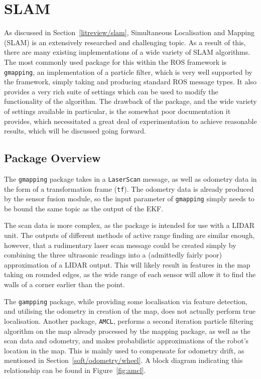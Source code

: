 \section{SLAM}\label{soft/SLAM}

As discussed in Section~\ref{litreview/slam}, Simultaneous Localisation and Mapping (SLAM) is an extensively
researched and challenging topic. As a result of this, there are many existing implementations of a wide
variety of SLAM algorithms. The most commonly used package for this within the ROS framework
is \verb|gmapping|, an implementation of a particle filter, which is very well supported by the framework,
simply taking and producing standard ROS message types. It also provides a very rich suite of settings which
can be used to modify the functionality of the algorithm. The drawback of the package, and the wide variety
of settings available in particular, is the somewhat poor documentation it provides, which necessitated a
great deal of experimentation to achieve reasonable results, which will be discussed going forward.

\subsection{Package Overview}\label{soft/SLAM/package}

The \verb|gmapping| package takes in a \verb|LaserScan| message, as well as odometry data in the form of a
transformation frame (\verb|tf|). The odometry data is already produced by the sensor fusion module, so the
input parameter of \verb|gmapping| simply needs to be bound the same topic as the output of the EKF.

The scan data is more complex, as the package is intended for use with a LIDAR unit. The outputs of different
methods of active range finding are similar enough, however, that a rudimentary laser scan message could be
created simply by combining the three ultrasonic readings into a (admittedly fairly poor) approximation of a
LIDAR output. This will likely result in features in the map taking on rounded edges, as the wide range of
each sensor will allow it to find the walls of a corner earlier than the point.

The \verb|gampping| package, while providing some localisation via feature detection, and utilising the odometry
in creation of the map, does not actually perform true localisation. Another package, \verb|AMCL|, performs a
second iteration particle filtering algorithm on the map already processed by the mapping package, as well as
the scan data and odometry, and makes probabilistic approximations of the robot's location in the map. This is
mainly used to compensate for odometry drift, as mentioned in Section~\ref{soft/odometry/wheel}. A block diagram
indicating this relationship can be found in Figure~\ref{fig:amcl}.

